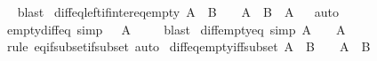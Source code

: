 \begin{isabellebody}
\isadelimproof
\ %
\endisadelimproof
%
\isatagproof
{}\isamarkupfalse%
\ blast%
\endisatagproof
{\isafoldproof}%
%
\isadelimproof
%
\endisadelimproof
\isanewline
\isanewline
{}\isamarkupfalse%
\ diff{\isacharunderscore}{\kern0pt}eq{\isacharunderscore}{\kern0pt}left{\isacharunderscore}{\kern0pt}if{\isacharunderscore}{\kern0pt}inter{\isacharunderscore}{\kern0pt}eq{\isacharunderscore}{\kern0pt}empty{\isacharcolon}{\kern0pt}\ {\isachardoublequoteopen}A\ {\isasyminter}\ B\ {\isacharequal}{\kern0pt}\ {\isacharbraceleft}{\kern0pt}{\isacharbraceright}{\kern0pt}\ {\isasymLongrightarrow}\ A\ {\isasymsetminus}\ B\ {\isacharequal}{\kern0pt}\ A{\isachardoublequoteclose}%
\isadelimproof
\ %
\endisadelimproof
%
\isatagproof
{}\isamarkupfalse%
\ auto%
\endisatagproof
{\isafoldproof}%
%
\isadelimproof
%
\endisadelimproof
\isanewline
\isanewline
{}\isamarkupfalse%
\ empty{\isacharunderscore}{\kern0pt}diff{\isacharunderscore}{\kern0pt}eq\ {\isacharbrackleft}{\kern0pt}simp{\isacharbrackright}{\kern0pt}{\isacharcolon}{\kern0pt}\ {\isachardoublequoteopen}{\isacharbraceleft}{\kern0pt}{\isacharbraceright}{\kern0pt}\ {\isasymsetminus}\ A\ {\isacharequal}{\kern0pt}\ {\isacharbraceleft}{\kern0pt}{\isacharbraceright}{\kern0pt}{\isachardoublequoteclose}%
\isadelimproof
\ %
\endisadelimproof
%
\isatagproof
{}\isamarkupfalse%
\ blast%
\endisatagproof
{\isafoldproof}%
%
\isadelimproof
%
\endisadelimproof
\isanewline
\isanewline
{}\isamarkupfalse%
\ diff{\isacharunderscore}{\kern0pt}empty{\isacharunderscore}{\kern0pt}eq\ {\isacharbrackleft}{\kern0pt}simp{\isacharbrackright}{\kern0pt}{\isacharcolon}{\kern0pt}\ {\isachardoublequoteopen}A\ {\isasymsetminus}\ {\isacharbraceleft}{\kern0pt}{\isacharbraceright}{\kern0pt}\ {\isacharequal}{\kern0pt}\ A{\isachardoublequoteclose}\isanewline
%
\isadelimproof
\ \ %
\endisadelimproof
%
\isatagproof
{}\isamarkupfalse%
\ {\isacharparenleft}{\kern0pt}rule\ eq{\isacharunderscore}{\kern0pt}if{\isacharunderscore}{\kern0pt}subset{\isacharunderscore}{\kern0pt}if{\isacharunderscore}{\kern0pt}subset{\isacharparenright}{\kern0pt}\ auto%
\endisatagproof
{\isafoldproof}%
%
\isadelimproof
\isanewline
%
\endisadelimproof
\isanewline
{}\isamarkupfalse%
\ diff{\isacharunderscore}{\kern0pt}eq{\isacharunderscore}{\kern0pt}empty{\isacharunderscore}{\kern0pt}iff{\isacharunderscore}{\kern0pt}subset{\isacharcolon}{\kern0pt}\ {\isachardoublequoteopen}A\ {\isasymsetminus}\ B\ {\isacharequal}{\kern0pt}\ {\isacharbraceleft}{\kern0pt}{\isacharbraceright}{\kern0pt}\ {\isasymlongleftrightarrow}\ A\ {\isasymsubseteq}\ B{\isachardoublequoteclose}\isanewline

\end{isabellebody}
